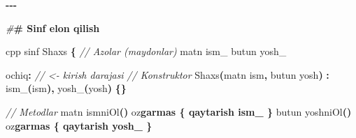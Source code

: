 \documentclass[a4paper,11pt,twoside,openright]{book}
\newenvironment{Shaded}{\begin{snugshade}}{\end{snugshade}}
\newcommand{\CharTok}[1]{\textcolor[rgb]{0.31,0.60,0.02}{#1}}
\newcommand{\CommentTok}[1]{\textcolor[rgb]{0.56,0.35,0.01}{\textit{#1}}}
\newcommand{\ErrorTok}[1]{\textcolor[rgb]{0.64,0.00,0.00}{\textbf{#1}}}
\newcommand{\NormalTok}[1]{#1}
\newcommand{\OperatorTok}[1]{\textcolor[rgb]{0.81,0.36,0.00}{\textbf{#1}}}
\newcommand{\PreprocessorTok}[1]{\textcolor[rgb]{0.56,0.35,0.01}{\textit{#1}}}
\newcommand{\VariableTok}[1]{\textcolor[rgb]{0.00,0.00,0.00}{#1}}
\begin{document}
\begin{Shaded}
\begin{Highlighting}[]
\OperatorTok{{-}{-}{-}}

\PreprocessorTok{\#}\ErrorTok{\# Sinf e\textquotesingle{}lon qilish}

\ErrorTok{\textasciigrave{}\textasciigrave{}\textasciigrave{}}\NormalTok{cpp}
\NormalTok{sinf Shaxs }\OperatorTok{\{}
    \CommentTok{// A\textquotesingle{}zolar (maydonlar)}
\NormalTok{    matn }\VariableTok{ism\_}
\NormalTok{    butun }\VariableTok{yosh\_}

\NormalTok{ochiq}\OperatorTok{:}   \CommentTok{// \textless{}{-} kirish darajasi}
    \CommentTok{// Konstruktor}
\NormalTok{    Shaxs}\OperatorTok{(}\NormalTok{matn ism}\OperatorTok{,}\NormalTok{ butun yosh}\OperatorTok{)} \OperatorTok{:} \VariableTok{ism\_}\OperatorTok{(}\NormalTok{ism}\OperatorTok{),} \VariableTok{yosh\_}\OperatorTok{(}\NormalTok{yosh}\OperatorTok{)} \OperatorTok{\{\}}

    \CommentTok{// Metodlar}
\NormalTok{    matn ismniOl}\OperatorTok{()}\NormalTok{ o}\CharTok{\textquotesingle{}z}\ErrorTok{garmas \{ qaytarish ism\_ \}}
\NormalTok{    butun yoshniOl}\OperatorTok{()}\NormalTok{ o}\CharTok{\textquotesingle{}z}\ErrorTok{garmas \{ qaytarish yosh\_ \}}


\end{Highlighting}
\end{Shaded}
\end{document}
